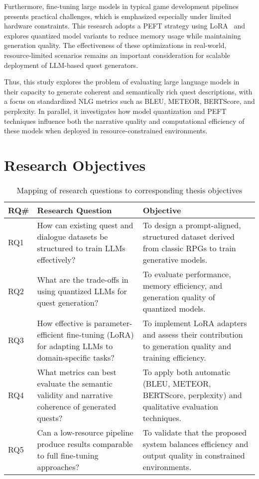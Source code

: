 Furthermore, fine-tuning large models in typical game development pipelines presents
practical challenges, which is emphasized especially under limited hardware constraints.
This research adopts a PEFT strategy using LoRA~\cite{hu2022lora,peft} and explores quantized model
variants to reduce memory usage while maintaining generation quality. The effectiveness
of these optimizations in real-world, resource-limited scenarios remains an important
consideration for scalable deployment of LLM-based quest generators.

Thus, this study explores the problem of evaluating large language models in their
capacity to generate coherent and semantically rich quest descriptions, with a focus on
standardized NLG metrics such as BLEU, METEOR, BERTScore, and perplexity. In
parallel, it investigates how model quantization and PEFT techniques influence both the
narrative quality and computational efficiency of these models when deployed in resource-constrained
environments.

\section{Research Objectives}

\begin{table}[t]
  \centering
  \scriptsize
  \renewcommand{\arraystretch}{1.3}
  \begin{tabularx}{0.95\textwidth}{
    >{\centering\arraybackslash}p{1cm}
    >{\raggedright\arraybackslash}X
    >{\raggedright\arraybackslash}X
  }
  \toprule
  \textbf{RQ\#} & \textbf{Research Question} & \textbf{Objective} \\
  \midrule
  RQ1
    & How can existing quest and dialogue datasets be structured to train LLMs effectively?
    & To design a prompt-aligned, structured dataset derived from classic RPGs to train generative models. \\
  RQ2
    & What are the trade-offs in using quantized LLMs for quest generation?
    & To evaluate performance, memory efficiency, and generation quality of quantized models. \\
  RQ3
    & How effective is parameter-efficient fine-tuning (LoRA) for adapting LLMs to domain-specific tasks?
    & To implement LoRA adapters and assess their contribution to generation quality and training efficiency. \\
  RQ4
    & What metrics can best evaluate the semantic validity and narrative coherence of generated quests?
    & To apply both automatic (BLEU, METEOR, BERTScore, perplexity) and qualitative evaluation techniques. \\
  RQ5
    & Can a low-resource pipeline produce results comparable to full fine-tuning approaches?
    & To validate that the proposed system balances efficiency and output quality in constrained environments. \\
  \bottomrule
  \end{tabularx}
  \caption{Mapping of research questions to corresponding thesis objectives}
  \label{table:research_questions}
\end{table}


